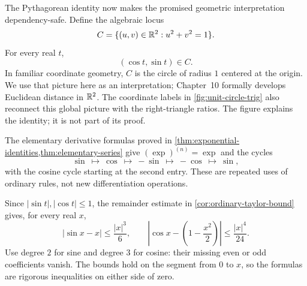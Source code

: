 The Pythagorean identity now makes the promised geometric interpretation
dependency-safe. Define the algebraic locus
\[
C=\{(u,v)\in\mathbb{R}^2:u^2+v^2=1\}.
\]
For every real $t$,
\[
(\cos t,\sin t)\in C.
\]
In familiar coordinate geometry, $C$ is the circle of radius $1$ centered at
the origin. We use that picture here as an interpretation; Chapter~10
formally develops Euclidean distance in $\mathbb{R}^2$. The coordinate labels in
\cref{fig:unit-circle-trig} also reconnect this global picture with the
right-triangle ratios. The figure explains the identity; it is not part of
its proof.


The elementary
derivative formulas proved in \cref{thm:exponential-identities,thm:elementary-series} give $(\exp)^{(n)}=\exp$ and the cycles
\[
\sin\ \longmapsto\ \cos\ \longmapsto\ -\sin\ \longmapsto\ -\cos
\ \longmapsto\ \sin,
\]
with the cosine cycle starting at the second entry. These are repeated
uses of ordinary rules, not new differentiation operations.


\begin{example}
Since $|\sin t|,|\cos t|\leq1$, the remainder estimate in
\cref{cor:ordinary-taylor-bound} gives, for every real $x$,
\[
\left|\sin x-x\right|\leq\frac{|x|^3}{6},\qquad
\left|\cos x-\left(1-\frac{x^2}{2}\right)\right|
\leq\frac{|x|^4}{24}.
\]
Use degree $2$ for sine and degree $3$ for cosine: their missing even or
odd coefficients vanish. The bounds hold on the segment from $0$ to $x$,
so the formulas are rigorous inequalities on either side of zero.
\end{example}

